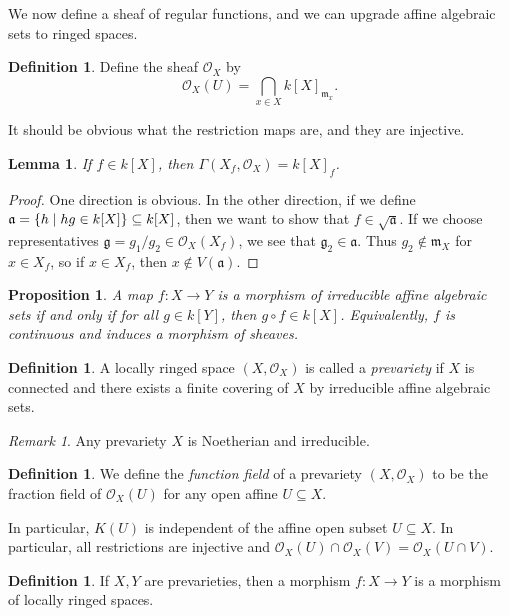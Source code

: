 \documentclass[leqno, openany]{memoir}
\newtheorem{prop}[thm]{Proposition}
\newtheorem{lem}[thm]{Lemma}
\theoremstyle{definition}
\newtheorem{defn}[thm]{Definition}
\theoremstyle{remark}
\newtheorem{rmk}[thm]{Remark}
\theoremstyle{plain}
\theoremstyle{definition}
\theoremstyle{remark}
\newcommand{\mc}[1]{\mathcal{#1}}
\newcommand{\mf}[1]{\mathfrak{#1}}
\begin{document}
We now define a sheaf of regular functions, and we can upgrade affine algebraic sets to ringed spaces.

\begin{defn}
    Define the sheaf $\mc{O}_X$ by
    \[ \mc{O}_X(U) = \bigcap_{x \in X} {k[X]}_{\mf{m}_x}. \]
\end{defn}
It should be obvious what the restriction maps are, and they are injective.

\begin{lem}
    If $f \in k[X]$, then $\Gamma(X_f, \mc{O}_X) = {k[X]}_f$.
\end{lem}

\begin{proof}
    One direction is obvious. In the other direction, if we define $\mf{a} = \qty{h \mid h g \in k[X]} \subseteq k[X]$, then we want to show that $f \in \sqrt{\mf{a}}$. If we choose representatives $\mf{g} = g_1 / g_2 \in \mc{O}_X(X_f)$, we see that $\mf{g}_2 \in \mf{a}$. Thus $g_2 \notin \mf{m}_X$ for $x \in X_f$, so if $x \in X_f$, then $x \notin V(\mf{a})$.
\end{proof}

\begin{prop}
    A map $f \colon X \to Y$ is a morphism of irreducible affine algebraic sets if and only if for all $g \in k[Y]$, then $g \circ f \in k[X]$. Equivalently, $f$ is continuous and induces a morphism of sheaves.
\end{prop}

\begin{defn}
    A locally ringed space $(X, \mc{O}_X)$ is called a \textit{prevariety} if $X$ is connected and there exists a finite covering of $X$ by irreducible affine algebraic sets.
\end{defn}

\begin{rmk}
    Any prevariety $X$ is Noetherian and irreducible.
\end{rmk}

\begin{defn}
    We define the \textit{function field} of a prevariety $(X, \mc{O}_X)$ to be the fraction field of $\mc{O}_X(U)$ for any open affine $U \subseteq X$.
\end{defn}

In particular, $K(U)$ is independent of the affine open subset $U \subseteq X$. In particular, all restrictions are injective and $\mc{O}_X(U) \cap \mc{O}_X(V) = \mc{O}_X(U \cap V)$.

\begin{defn}
    If $X, Y$ are prevarieties, then a morphism $f \colon X \to Y$ is a morphism of locally ringed spaces.
\end{defn}
\end{document}
